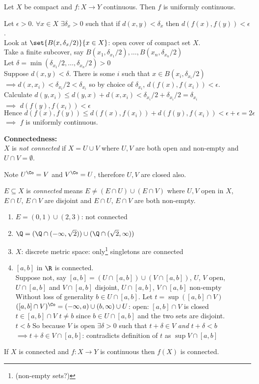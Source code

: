 \prop Let $X$ be compact and $f\colon X\to Y$ continuous.  Then $f$ is uniformly continuous.

\pf Let $\epsilon>0$.  $\forall x\in X$ $\exists\delta_x>0$ such that if $d(x,y)<\delta_x$ then $d(f(x),f(y))<\epsilon$. \\
Look at $\set{B(x,\delta_x/2)}{x\in X}$: open cover of compact set $X$. \\
Take a finite subcover, say $B(x_1,\delta_{x_1}/2),\dotsc,B(x_n,\delta_{x_n}/2)$ \\
Let $\delta=\min(\delta_{x_1}/2,\dotsc,\delta_{x_n}/2)>0$ \\
Suppose $d(x,y)<\delta$.  There is some $i$ such that $x\in B(x_i,\delta_{x_i}/2)$ $\implies d(x,x_i)<\delta_{x_i}/2<\delta_{x_i}$ so by choice of $\delta_{x_i}$, $d(f(x),f(x_i))<\epsilon$. \\
Calculate $d(y,x_i)\leq d(y,x)+d(x,x_i)<\delta_{x_i}/2+\delta_{x_i}/2=\delta_{x_i}$ \\
$\implies$ $d(f(y),f(x_i))<\epsilon$ \\
\[ \text{Hence } d(f(x),f(y))\leq d(f(x),f(x_i))+d(f(y),f(x_i))<\epsilon+\epsilon=2\epsilon \]
$\implies$ $f$ is uniformly continuous.

\textbf{Connectedness:} \\
 $X$ is \emph{not connected} if $X=U\cup V$ where $U,V$ are both open and non-empty and $U\cap V=\emptyset$.

Note $U^\Co=V$ and $V^\Co=U$, therefore $U,V$ are closed also.

$E\subseteq X$ is \emph{connected} means $E\neq(E\cap U)\cup(E\cap V)$ where $U,V$ open in $X$, $E\cap U$, $E\cap V$ are disjoint and $E\cap U$, $E\cap V$ are both non-empty.

\ex\begin{enumerate}
\item $E=(0,1)\cup(2,3)$: not connected
\item $\Q=(\Q\cap(-\infty,\sqrt2))\cup(\Q\cap(\sqrt2,\infty))$
\item $X$: discrete metric space: only\footnote{(non-empty sets?)} singletons are connected
\item $[a,b]$ in $\R$ is connected. \\
Suppose not, say $[a,b]=(U\cap[a,b])\cup(V\cap[a,b])$, $U$, $V$ open, $U\cap[a,b]$ and $V\cap[a,b]$ disjoint, $U\cap[a,b]$, $V\cap[a,b]$ non-empty \\
Without loss of generality $b\in U\cap[a,b]$.  Let $t=\sup([a,b]\cap V)$ \\
$([a,b]\cap V)^\Co=(-\infty,a)\cup(b,\infty)\cup U$: open: $[a,b]\cap V$ is closed \\
$t\in[a,b]\cap V$ \quad $t\neq b$ since $b\in U\cap[a,b]$ and the two sets are disjoint. \\
$t<b$ \quad So because $V$ is open $\exists\delta>0$ such that $t+\delta\in V$ \emph{and} $t+\delta<b$ \\
$\implies t+\delta\in V\cap[a,b]$: contradicts definition of $t$ as $\sup V\cap[a,b]$
\end{enumerate}
\prop If $X$ is connected and $f\colon X\to Y$ is continuous then $f(X)$ is connected.

